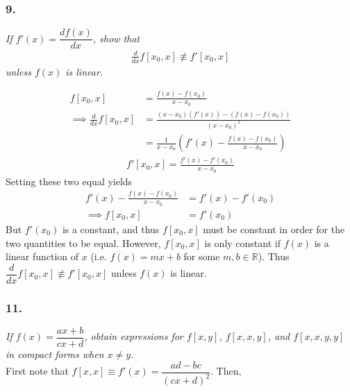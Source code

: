\documentclass[12pt]{article}
\begin{document}
\subsubsection*{9.}

{\it If $f'(x) = \dfrac{df(x)}{dx}$, show that}
\begin{align*}
\frac{d}{dx}f[x_0, x] \not\equiv f'[x_0, x]
\end{align*}
{\it unless $f(x)$ is linear.}

\begin{align*}
f[x_0, x] &= \frac{f(x) - f(x_0)}{x - x_0} \\
\implies \frac{d}{dx}f[x_0, x] &= \frac{(x - x_0)(f'(x)) - (f(x) - f(x_0))}{(x - x_0)^2} \\
&= \frac{1}{x - x_0}\left(f'(x) - \frac{f(x) - f(x_0)}{x - x_0}\right)
\end{align*}
\begin{align*}
f'[x_0, x] = \frac{f'(x) - f'(x_0)}{x - x_0}
\end{align*}
Setting these two equal yields
\begin{align*}
f'(x) - \frac{f(x) - f(x_0)}{x - x_0} &= f'(x) - f'(x_0) \\
\implies f[x_0, x] &= f'(x_0)
\end{align*}
But $f'(x_0)$ is a constant, and thus $f[x_0, x]$ must be constant in order for the two quantities to be equal.  However, $f[x_0, x]$ is only constant if $f(x)$ is a linear function of $x$ (i.e. $f(x) = mx + b$ for some $m, b \in \mathbb{R}$).  Thus $ \dfrac{d}{dx}f[x_0, x] \not\equiv f'[x_0, x]$ unless $f(x)$ is linear.

\subsubsection*{11.}

{\it If $f(x) = \dfrac{ax + b}{cx + d}$, obtain expressions for $f[x, y]$, $f[x, x, y]$, and $f[x, x, y, y]$ in compact forms when $x \neq y$.} \\

\noindent First note that $f[x, x] \equiv f'(x) = \dfrac{ad - bc}{(cx + d)^2}$.  Then,
\end{document}
